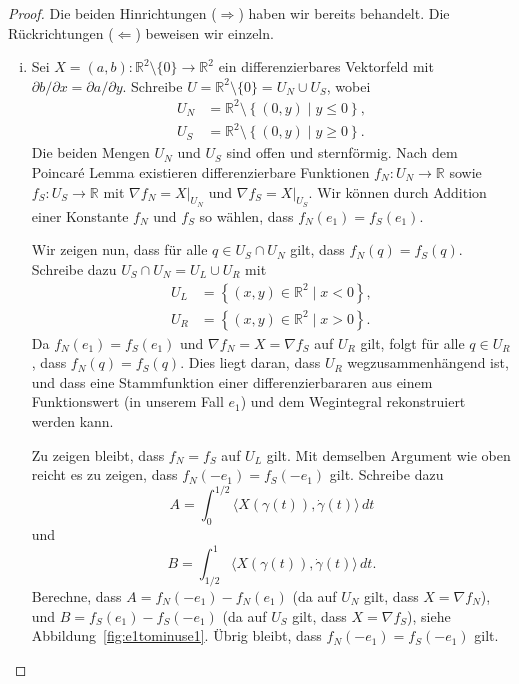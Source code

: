 \documentclass[../main.tex]{subfiles}
\begin{document}
\begin{proof}
  Die beiden Hinrichtungen ($\Rightarrow$) haben wir bereits behandelt.
  Die Rückrichtungen ($\Leftarrow$) beweisen wir einzeln.
  \begin{enumerate}[(i)]
    \item Sei $X = (a, b) \colon \mathbb{R}^2 \setminus \{0\} \to \mathbb{R}^2$ 
      ein differenzierbares Vektorfeld mit $\partial b / \partial x =
      \partial a / \partial y$.
      Schreibe $U = \mathbb{R}^2 \setminus \{0\} = U_N \cup U_S$, wobei
      \begin{align*}
        U_N & = \mathbb{R}^2 \setminus \left\{(0, y) \mid y \leq 0\right\}, \\
        U_S & = \mathbb{R}^2  \setminus \left\{(0, y) \mid y \geq 0 \right\}.
      \end{align*}
      Die beiden Mengen $U_N$ und $U_S$ sind offen und sternförmig.
      Nach dem Poincaré Lemma existieren 
      differenzierbare Funktionen $f_N \colon U_N \to \mathbb{R}$ 
      sowie $f_S \colon U_S \to \mathbb{R}$ mit
      $\nabla f_N = X|_{U_N}$ und $\nabla f_S = X|_{U_S}$.
      Wir können
      durch Addition einer Konstante 
      $f_N$ und $f_S$ so wählen, dass
      $f_N(e_1) = f_S(e_1)$.

      Wir zeigen nun, dass für alle $q \in U_S \cap U_N$ gilt,
      dass $f_N(q) = f_S(q)$.
      Schreibe dazu $U_S \cap U_N = U_L \cup U_R$ mit
      \begin{align*}
        U_L & = \left\{(x, y) \in \mathbb{R}^2 \mid x < 0 \right\}, \\
        U_R &= \left\{(x, y) \in \mathbb{R}^2 \mid x > 0\right\}.
      \end{align*}
      Da $f_N(e_1) = f_S(e_1)$ und $\nabla f_N = X = \nabla f_S$ 
      auf $U_R$ gilt, folgt für alle $q \in U_R$, dass
      $f_N(q) = f_S(q)$.
      Dies liegt daran, dass $U_R$ wegzusammenhängend ist,
      und dass eine Stammfunktion einer differenzierbararen
      aus einem Funktionswert (in unserem Fall $e_1$)
      und dem Wegintegral rekonstruiert werden kann.

      Zu zeigen bleibt, dass $f_N = f_S$ auf $U_L$ gilt.
      Mit demselben Argument wie oben reicht es zu zeigen,
      dass $f_N(-e_1) = f_S(-e_1)$ gilt.
      Schreibe dazu
      \[
        A = 
        \int_{0}^{1/2} \langle X(\gamma(t)), \dot \gamma(t) \rangle \, dt
      \]
      und
      \[
        B = 
        \int_{1/2}^{1} \langle X(\gamma(t)), \dot \gamma(t) \rangle \, dt.
      \]
      Berechne, dass
      \(
        A = f_N(-e_1) - f_N(e_1)
      \)
      (da auf $U_N$ gilt,
      dass $X = \nabla f_N$),
      und $B = f_S(e_1) - f_S(-e_1)$
      (da auf $U_S$ gilt, dass $X = 
      \nabla f_S$),
      siehe Abbildung~\ref{fig:e1tominuse1}.
      Übrig bleibt, dass
      $f_N(-e_1) = f_S(-e_1)$ gilt.


\end{enumerate}
\end{proof}
\end{document}
